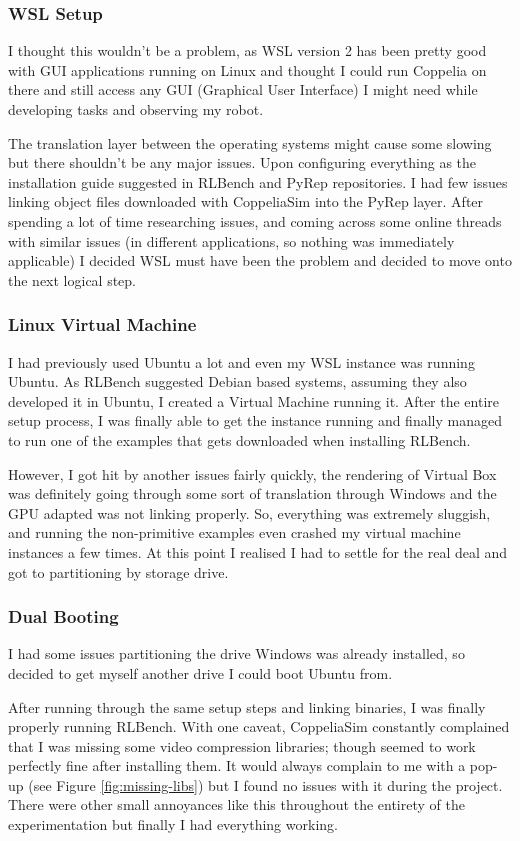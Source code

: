 \subsubsection{WSL Setup}
I thought this wouldn't be a problem, as WSL version 2 has been pretty good with GUI applications running on Linux and thought I could run Coppelia on there and still access any GUI (Graphical User Interface) I might need while developing tasks and observing my robot.

The translation layer between the operating systems might cause some slowing but there shouldn't be any major issues. Upon configuring everything as the installation guide suggested in RLBench and PyRep repositories. I had few issues linking object files downloaded with CoppeliaSim into the PyRep layer. After spending a lot of time researching issues, and coming across some online threads with similar issues (in different applications, so nothing was immediately applicable) I decided WSL must have been the problem and decided to move onto the next logical step.
 
\subsubsection{Linux Virtual Machine}
I had previously used Ubuntu a lot and even my WSL instance was running Ubuntu. As RLBench suggested Debian based systems, assuming they also developed it in Ubuntu, I created a Virtual Machine running it. After the entire setup process, I was finally able to get the instance running and finally managed to run one of the examples that gets downloaded when installing RLBench.

However, I got hit by another issues fairly quickly, the rendering of Virtual Box was definitely going through some sort of translation through Windows and the GPU adapted was not linking properly. So, everything was extremely sluggish, and running the non-primitive examples even crashed my virtual machine instances a few times. At this point I realised I had to settle for the real deal and got to partitioning by storage drive.

\subsubsection{Dual Booting}
I had some issues partitioning the drive Windows was already installed, so decided to get myself another drive I could boot Ubuntu from.

After running through the same setup steps and linking binaries, I was finally properly running RLBench. With one caveat, CoppeliaSim constantly complained that I was missing some video compression libraries; though seemed to work perfectly fine after installing them. It would always complain to me with a pop-up (see Figure \ref{fig:missing-libs}) but I found no issues with it during the project. There were other small annoyances like this throughout the entirety of the experimentation but finally I had everything working.

